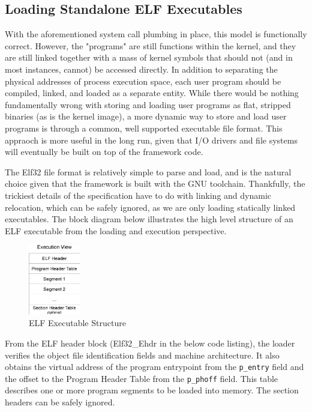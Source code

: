 \documentclass[titlepage]{article}
\begin{document}
\subsection{Loading Standalone ELF Executables}

With the aforementioned system call plumbing in place, this model is 
functionally correct. However, the "programs" are still functions within the
kernel, and they are still linked together with a mass of kernel symbols that
should not (and in most instances, cannot) be accessed directly. In addition to
separating the physical addresses of process execution space, each user program
should be compiled, linked, and loaded as a separate entity. While there
would be nothing fundamentally wrong with storing and loading user programs as
flat, stripped binaries (as is the kernel image), a more dynamic way to store
and load user programs is through a common, well supported executable file
format. This appraoch is more useful in the long run, given that I/O drivers
and file systems will eventually be built on top of the framework code.

The Elf32 file format is relatively simple to parse and load, and is the natural
choice given that the framework is built with the GNU toolchain. Thankfully,
the trickiest details of the specification have to do with linking and dynamic
relocation, which can be safely ignored, as we are only loading statically
linked executables. The block diagram below illustrates the high level
structure of an ELF executable from the loading and execution perspective.

\begin{figure}[!ht]
    \centering
    \includegraphics[width=0.20\textwidth]{images/elf_block.eps}
    \caption{ELF Executable Structure}
\end{figure}

From the ELF header block (Elf32\_Ehdr in the below code listing), the loader
verifies the object file identification fields and machine architecture. It
also obtains the virtual address of the program entrypoint from the
\verb!p_entry! field and the offset to the Program Header Table from the
\verb!p_phoff! field. This table describes one or more program segments to be
loaded into memory. The section headers can be safely ignored.
\end{document}
